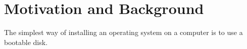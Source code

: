 \documentclass[../main.tex]{subfiles}
\begin{document}
\section{Motivation and Background}
\label{sec:motivation-and-background}

The simplest way of installing an operating system on a computer is to use a bootable disk.
\end{document}
